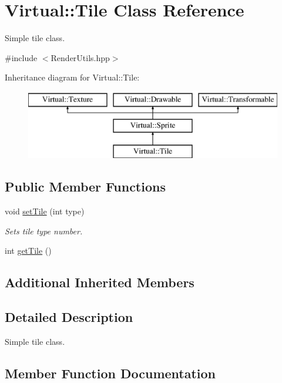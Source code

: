 \hypertarget{class_virtual_1_1_tile}{}\section{Virtual\+:\+:Tile Class Reference}
\label{class_virtual_1_1_tile}


Simple tile class.  




{\ttfamily \#include $<$Render\+Utils.\+hpp$>$}

Inheritance diagram for Virtual\+:\+:Tile\+:\begin{figure}[H]
\begin{center}
\leavevmode
\includegraphics[height=3.000000cm]{class_virtual_1_1_tile}
\end{center}
\end{figure}
\subsection*{Public Member Functions}
\begin{DoxyCompactItemize}
\item 
void \hyperlink{class_virtual_1_1_tile_a7e275a90e1b528130445c8e053d4dc66}{set\+Tile} (int type)
\begin{DoxyCompactList}\small\item\em Sets tile type number. \end{DoxyCompactList}\item 
int \hyperlink{class_virtual_1_1_tile_ae535b36cb182c5376739a4d6cdb7306b}{get\+Tile} ()
\end{DoxyCompactItemize}
\subsection*{Additional Inherited Members}


\subsection{Detailed Description}
Simple tile class. 

\subsection{Member Function Documentation}
\hypertarget{class_virtual_1_1_tile_ae535b36cb182c5376739a4d6cdb7306b}{}\label{class_virtual_1_1_tile_ae535b36cb182c5376739a4d6cdb7306b} 
